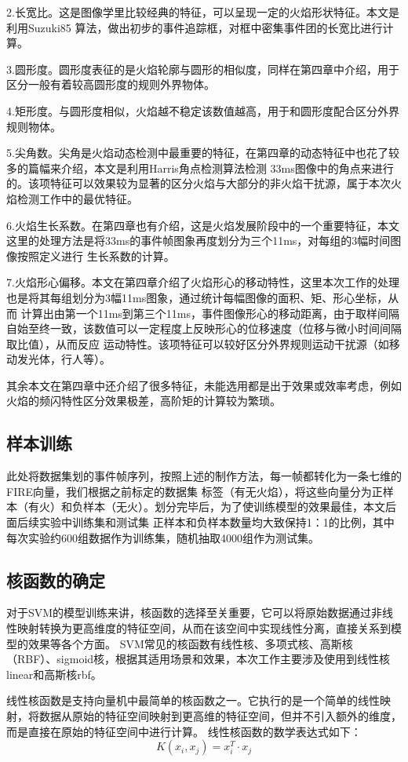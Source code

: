 2.长宽比。这是图像学里比较经典的特征，可以呈现一定的火焰形状特征。本文是利用Suzuki85 算法，做出初步的事件追踪框，对框中密集事件团的长宽比进行计算。

3.圆形度。圆形度表征的是火焰轮廓与圆形的相似度，同样在第四章中介绍，用于区分一般有着较高圆形度的规则外界物体。

4.矩形度。与圆形度相似，火焰越不稳定该数值越高，用于和圆形度配合区分外界规则物体。

5.尖角数。尖角是火焰动态检测中最重要的特征，在第四章的动态特征中也花了较多的篇幅来介绍，本文是利用Harris角点检测算法检测
33ms图像中的角点来进行的。该项特征可以效果较为显著的区分火焰与大部分的非火焰干扰源，属于本次火焰检测工作中的最优特征。

6.火焰生长系数。在第四章也有介绍，这是火焰发展阶段中的一个重要特征，本文这里的处理方法是将33ms的事件帧图象再度划分为三个11ms，对每组的3幅时间图像按照定义进行
生长系数的计算。

7.火焰形心偏移。本文在第四章介绍了火焰形心的移动特性，这里本次工作的处理也是将其每组划分为3幅11ms图象，通过统计每幅图像的面积、矩、形心坐标，从而
计算出由第一个11ms到第三个11ms，事件图像形心的移动距离，由于取样间隔自始至终一致，该数值可以一定程度上反映形心的位移速度（位移与微小时间间隔取比值），从而反应
运动特性。该项特征可以较好区分外界规则运动干扰源（如移动发光体，行人等）。

其余本文在第四章中还介绍了很多特征，未能选用都是出于效果或效率考虑，例如火焰的频闪特性区分效果极差，高阶矩的计算较为繁琐。
\subsection{样本训练}
此处将数据集划的事件帧序列，按照上述的制作方法，每一帧都转化为一条七维的FIRE向量，我们根据之前标定的数据集
标签（有无火焰），将这些向量分为正样本（有火）和负样本（无火）。划分完毕后，为了使训练模型的效果最佳，本文后面后续实验中训练集和测试集
正样本和负样本数量均大致保持1：1的比例，其中每次实验约600组数据作为训练集，随机抽取4000组作为测试集。
\subsection{核函数的确定}
对于SVM的模型训练来讲，核函数的选择至关重要，它可以将原始数据通过非线性映射转换为更高维度的特征空间，从而在该空间中实现线性分离，直接关系到模型的效果等各个方面。
SVM常见的核函数有线性核、多项式核、高斯核（RBF）、sigmoid核，根据其适用场景和效果，本次工作主要涉及使用到线性核linear和高斯核rbf。

线性核函数是支持向量机中最简单的核函数之一。它执行的是一个简单的线性映射，将数据从原始的特征空间映射到更高维的特征空间，但并不引入额外的维度，而是直接在原始的特征空间中进行计算。
线性核函数的数学表达式如下：
\begin{equation} 
    K(x_i,x_j)=x_i^T·x_j
\end{equation}

